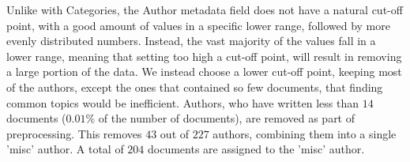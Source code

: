 Unlike with Categories, the Author metadata field does not have a natural cut-off point, with a good amount of values in a specific lower range, followed by more evenly distributed numbers.
Instead, the vast majority of the values fall in a lower range, meaning that setting too high a cut-off point, will result in removing a large portion of the data.
We instead choose a lower cut-off point, keeping most of the authors, except the ones that contained so few documents, that finding common topics would be inefficient.
Authors, who have written less than $14$ documents ($0.01\%$ of the number of documents), are removed as part of preprocessing.
This removes $43$ out of $227$ authors, combining them into a single 'misc' author.
A total of $204$ documents are assigned to the 'misc' author.

